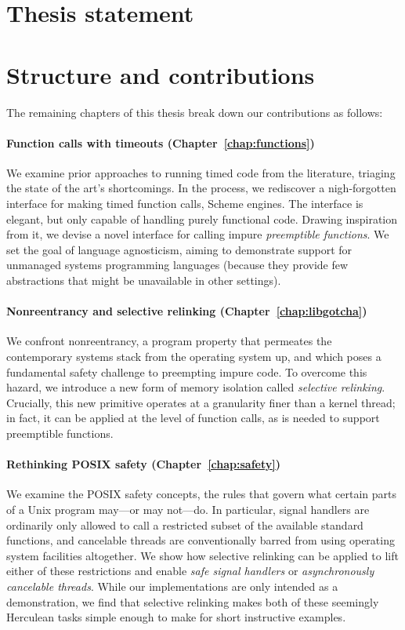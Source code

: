 \section{Thesis statement}




\section{Structure and contributions}

The remaining chapters of this thesis break down our contributions as follows:

\paragraph{Function calls with timeouts (Chapter~\ref{chap:functions})}
We examine prior approaches to running timed code from the literature, triaging the
state of the art's shortcomings.  In the process, we rediscover a nigh-forgotten
interface
for making timed function calls, Scheme engines.  The interface is elegant, but only
capable of handling purely functional code.  Drawing inspiration from it, we
devise a novel interface for calling impure \textit{preemptible functions}.
We set the goal of language agnosticism, aiming to demonstrate support
for unmanaged systems programming languages (because they provide few abstractions
that might be unavailable in other settings).

\paragraph{Nonreentrancy and selective relinking (Chapter~\ref{chap:libgotcha})}
We confront nonreentrancy, a program property that permeates the contemporary systems
stack from the operating system up, and which poses a fundamental safety challenge to
preempting impure code.  To overcome this hazard, we introduce a new form of memory
isolation called \textit{selective relinking}.  Crucially, this new primitive
operates at a granularity finer than a kernel thread; in fact, it can be applied at
the level of function calls, as is needed to support preemptible functions.

\paragraph{Rethinking POSIX safety (Chapter~\ref{chap:safety})}
We examine the POSIX safety concepts, the rules that govern what certain parts of a
Unix program may---or may not---do.  In particular, signal handlers are ordinarily
only allowed to call a restricted subset of the available standard functions, and
cancelable threads are conventionally barred from using operating system facilities
altogether.  We show how selective relinking can be applied to lift either of these
restrictions and enable \textit{safe signal handlers} or \textit{asynchronously
cancelable threads}.  While our implementations are only intended as a
demonstration, we find that selective relinking makes both of these seemingly
Herculean tasks simple enough to make for short instructive examples.

